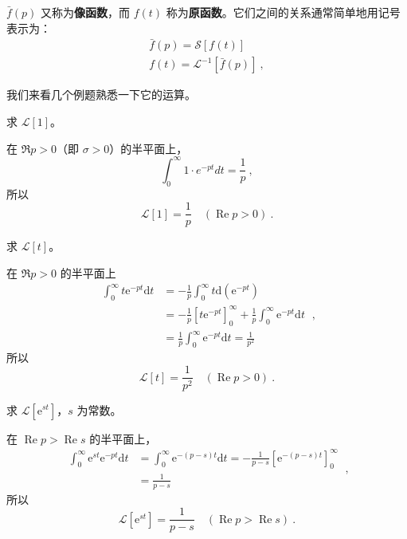 $\bar f(p)$ 又称为\textbf{像函数}，而 $f(t)$ 称为\textbf{原函数}。它们之间的关系通常简单地用记号表示为：
\begin{equation}
\begin{array}{l}\bar{f}(p)=\mathscr{S}[f(t)] \\ f(t)=\mathscr{L}^{-1}[\bar{f}(p)]~,\end{array}
\end{equation}

我们来看几个例题熟悉一下它的运算。

\begin{example}{}
求 $\mathscr L[1]$。

在 $\Re p>0$（即 $\sigma>0$）的半平面上，
\begin{equation}
\int_{0}^{\infty} 1 \cdot e^{-p t} d t=\frac{1}{p}~,
\end{equation}
所以
\begin{equation}
\mathscr{L}[1]=\frac{1}{p} \quad(\operatorname{Re} p>0)~.
\end{equation}
\end{example}

\begin{example}{}
求 $\mathscr L[t]$。

在 $\Re p>0$ 的半平面上
\begin{equation}
\begin{aligned} \int_{0}^{\infty} t \mathrm{e}^{-p t} \mathrm{d} t &=-\frac{1}{p} \int_{0}^{\infty} t \mathrm{d}\left(\mathrm{e}^{-p t}\right) \\ &=-\frac{1}{p}\left[t \mathrm{e}^{-p t}\right]_{0}^{\infty}+\frac{1}{p} \int_{0}^{\infty} \mathrm{e}^{-p t} \mathrm{d} t \\ &=\frac{1}{p} \int_{0}^{\infty} \mathrm{e}^{-p t} \mathrm{d} t=\frac{1}{p^{2}} \end{aligned}~,
\end{equation}
所以
\begin{equation}
\mathscr{L}[t]=\frac{1}{p^{2}} \quad(\operatorname{Re} p>0)~.
\end{equation}
\end{example}

\begin{example}{}
求 $\mathscr L[\mathrm e^{st}]$，$s$ 为常数。

在 $\operatorname{Re} p>\operatorname{Re} s$ 的半平面上，
\begin{equation}
\begin{aligned} \int_{0}^{\infty} \mathrm{e}^{s t} \mathrm{e}^{-p t} \mathrm{d} t &=\int_{0}^{\infty} \mathrm{e}^{-(p-s) t} \mathrm{d} t=-\frac{1}{p-s}\left[\mathrm{e}^{-(p-s) t}\right]_{0}^{\infty} \\ &=\frac{1}{p-s} \end{aligned}~,
\end{equation}
所以
\begin{equation}
\mathscr{L}\left[\mathrm{e}^{st}\right]=\frac{1}{p-s} \quad(\operatorname{Re} p>\operatorname{Re} s)~.
\end{equation}
\end{example}

